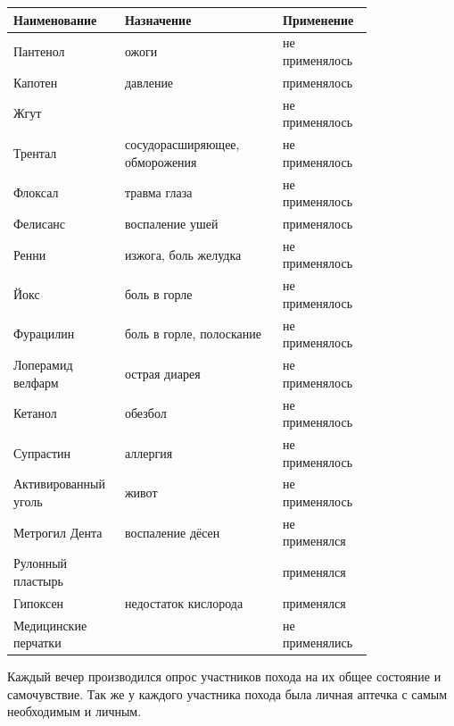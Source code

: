 \begin{tabular}{|>{\centering\arraybackslash}m{0.2\linewidth}
		|>{\centering\arraybackslash}m{0.4\linewidth}
		|>{\centering\arraybackslash}m{0.2\linewidth}|}
	\hline
	\textbf{Наименование} & \textbf{Назначение} & \textbf{Применение}\\
	\hline
	Пантенол & ожоги & не применялось \\
	\hline
	Капотен & давление & применялось \\
	\hline
	Жгут &  & не применялось \\
	\hline
	Трентал & сосудорасширяющее, обморожения & не применялось \\
	\hline
	Флоксал & травма глаза & не применялось \\
	\hline
	Фелисанс & воспаление ушей & применялось \\
	\hline
	Ренни & изжога, боль желудка & не применялось \\
	\hline
	Йокс & боль в горле & не применялось \\
	\hline
	Фурацилин & боль в горле, полоскание & не применялось \\
	\hline
	Лоперамид велфарм & острая диарея & не применялось \\
	\hline
	Кетанол & обезбол & не применялось \\
	\hline
	Супрастин & аллергия & не применялось \\
	\hline
	Активированный уголь & живот & не применялось \\
	\hline
	Метрогил Дента & воспаление дёсен & не применялся \\
	\hline
	Рулонный пластырь &  & применялся \\
	\hline
	Гипоксен & недостаток кислорода & применялся \\
	\hline
	Медицинские перчатки &  & не применялись \\
	\hline
\end{tabular}

Каждый вечер производился опрос участников похода на их общее состояние и самочувствие. Так же у каждого участника похода была личная аптечка с самым необходимым и личным. 
\clearpage
